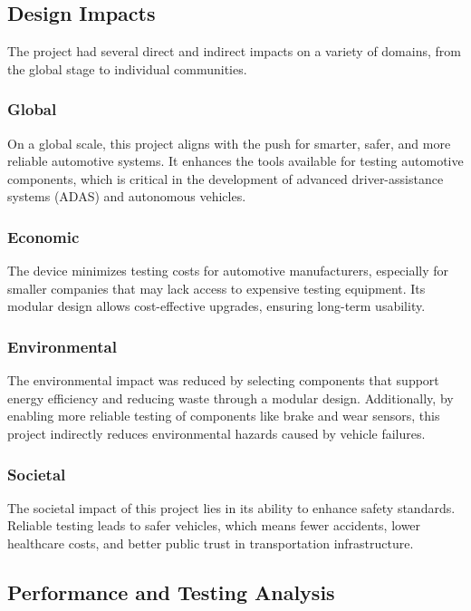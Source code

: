 \documentclass[12pt]{article}
\begin{document}
\subsection{Design Impacts}
The project had several direct and indirect impacts on a variety of domains,
from the global stage to individual communities.

\subsubsection{Global}
On a global scale, this project aligns with the push for smarter, safer, and
more reliable automotive systems. It enhances the tools available for testing
automotive components, which is critical in the development of advanced
driver-assistance systems (ADAS) and autonomous vehicles.

\subsubsection{Economic}
The device minimizes testing costs for automotive manufacturers, especially for
smaller companies that may lack access to expensive testing equipment. Its
modular design allows cost-effective upgrades, ensuring long-term usability.


\subsubsection{Environmental}
The environmental impact was reduced by selecting components that support
energy efficiency and reducing waste through a modular design. Additionally, by
enabling more reliable testing of components like brake and wear sensors, this
project indirectly reduces environmental hazards caused by vehicle failures.


\subsubsection{Societal}
The societal impact of this project lies in its ability to enhance safety
standards. Reliable testing leads to safer vehicles, which means fewer
accidents, lower healthcare costs, and better public trust in transportation
infrastructure.



\subsection{Performance and Testing Analysis}
\end{document}
